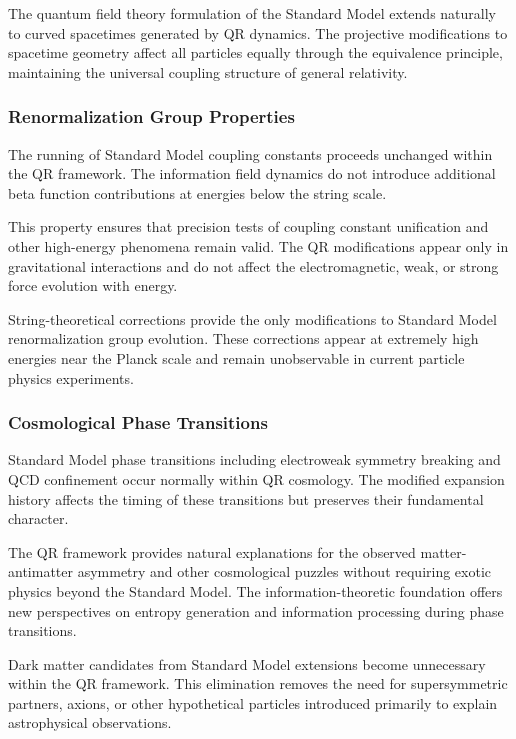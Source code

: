 The quantum field theory formulation of the Standard Model extends naturally to curved spacetimes generated by QR dynamics. The projective modifications to spacetime geometry affect all particles equally through the equivalence principle, maintaining the universal coupling structure of general relativity.

\subsubsection{Renormalization Group Properties}
\label{subsubsec:renormalization-group}

The running of Standard Model coupling constants proceeds unchanged within the QR framework. The information field dynamics do not introduce additional beta function contributions at energies below the string scale.

This property ensures that precision tests of coupling constant unification and other high-energy phenomena remain valid. The QR modifications appear only in gravitational interactions and do not affect the electromagnetic, weak, or strong force evolution with energy.

String-theoretical corrections provide the only modifications to Standard Model renormalization group evolution. These corrections appear at extremely high energies near the Planck scale and remain unobservable in current particle physics experiments.

\subsubsection{Cosmological Phase Transitions}
\label{subsubsec:phase-transitions}

Standard Model phase transitions including electroweak symmetry breaking and QCD confinement occur normally within QR cosmology. The modified expansion history affects the timing of these transitions but preserves their fundamental character.

The QR framework provides natural explanations for the observed matter-antimatter asymmetry and other cosmological puzzles without requiring exotic physics beyond the Standard Model. The information-theoretic foundation offers new perspectives on entropy generation and information processing during phase transitions.

Dark matter candidates from Standard Model extensions become unnecessary within the QR framework. This elimination removes the need for supersymmetric partners, axions, or other hypothetical particles introduced primarily to explain astrophysical observations.

